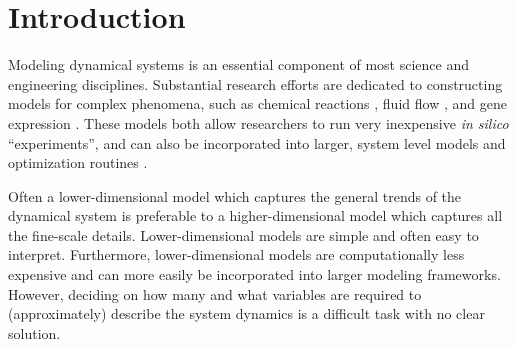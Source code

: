 
\chapter{Introduction\label{ch:intro}}

Modeling dynamical systems is an essential component of most science and engineering disciplines. 
%
Substantial research efforts are dedicated to constructing models for complex phenomena, such as chemical reactions \cite{...}, fluid flow \cite{...}, and gene expression \cite{...}. 
%
These models both allow researchers to run very inexpensive {\em in silico} ``experiments'', and can also be incorporated into larger, system level models and optimization routines \cite{...}. 

Often a lower-dimensional model which captures the general trends of the dynamical system is preferable to a higher-dimensional model which captures all the fine-scale details. 
%
Lower-dimensional models are simple and often easy to interpret.
%
Furthermore, lower-dimensional models are computationally less expensive and can more easily be incorporated into larger modeling frameworks. 
%
However, deciding on how many and what variables are required to (approximately) describe the system dynamics is a difficult task with no clear solution. 





